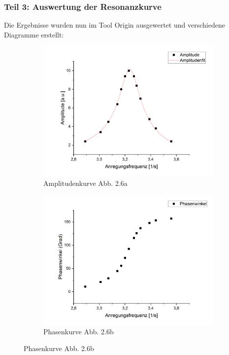         \subsubsection{Teil 3: Auswertung der Resonanzkurve}

            Die Ergebnisse wurden nun im Tool Origin ausgewertet und verschiedene Diagramme erstellt:

            \begin{figure}[H]
                \begin{subfigure}{0.48\textwidth}
                    \centering
                    \includegraphics[width=\textwidth]{bilder/AmplitudenkurveGruppe2.png}
                    \caption{Amplitudenkurve Abb. 2.6a}
                    \label{fig:Amplitudenkurve}
                \end{subfigure}
                \begin{subfigure}{0.48\textwidth}
                    \centering
                    \includegraphics[width=\textwidth]{bilder/PhasenwinkelGruppe2.png}
                    \caption{Phasenkurve Abb. 2.6b}
                    \label{fig:Phasenkurve}
                \end{subfigure}
            \end{figure}

